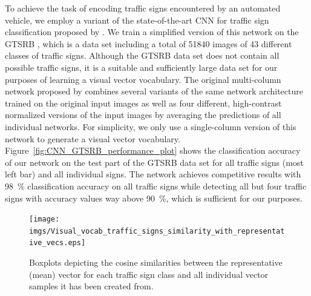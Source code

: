 To achieve the task of encoding traffic signs encountered by an automated vehicle, we employ a variant of the state-of-the-art \ac{CNN} for traffic sign classification proposed by \textcite{Ciresan2012}.
We train a simplified version of this network on the \acf{GTSRB} \parencite{Stallkamp2012}, which is a data set including a total of \num{51840} images of \num{43} different classes of traffic signs.
Although the \ac{GTSRB} data set does not contain all possible traffic signs, it is a suitable and sufficiently large data set for our purposes of learning a visual vector vocabulary.
The original multi-column network proposed by \textcite{Ciresan2012} combines several variants of the same network architecture trained on the original input images as well as four different, high-contrast normalized versions of the input images by averaging the predictions of all individual networks.
For simplicity, we only use a single-column version of this network to generate a visual vector vocabulary. 
Figure~\ref{fig:CNN_GTSRB_performance_plot} shows the classification accuracy of our network on the test part of the \ac{GTSRB} data set for all traffic signs (most left bar) and all individual signs.
The network achieves competitive results with \SI{98}{\percent} classification accuracy on all traffic signs while detecting all but four traffic signs with accuracy values way above \SI{90}{\percent}, which is sufficient for our purposes.

\begin{figure}[t]
    \centering
    \texttt{[image: imgs/Visual\_vocab\_traffic\_signs\_similarity\_with\_representative\_vecs.eps]}
    \caption{Boxplots depicting the cosine similarities between the representative (mean) vector for each traffic sign class and all individual vector samples it has been created from.}
    \label{fig:visual_vocab_traffic_signs_similarity_with_representative_vecs}
\end{figure}

